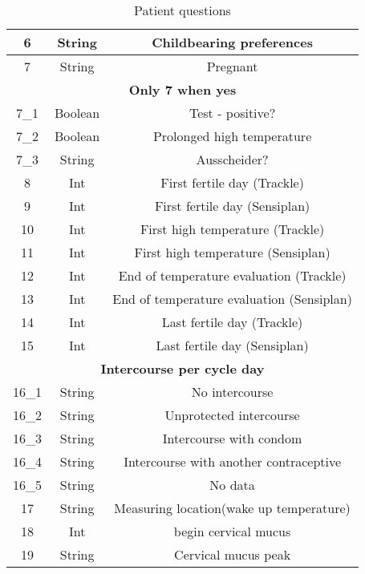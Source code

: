 \documentclass[
a4paper,
11pt
]{article}
\begin{document}
\begin{itemize}
\begin{center}
\begin{table}[h]
\begin{tabular}{|c|c|c|}
				\hline
				6 & String & Childbearing preferences \\
				\hline
				7 & String & Pregnant \\
				\hline
				\multicolumn{3}{c}{\textbf{Only 7 when yes}} \\
				\hline
				7\_1 & Boolean & Test - positive? \\
				\hline
				7\_2 & Boolean & Prolonged high temperature \\
				\hline
				7\_3 & String & Ausscheider? \\
				\hline
				8 & Int & First fertile day (Trackle) \\
				\hline
				9 & Int & First fertile day (Sensiplan\textsuperscript{\textcopyright}) \\
				\hline
				10 & Int & First high temperature (Trackle) \\
				\hline
				11 & Int & First high temperature (Sensiplan\textsuperscript{\textcopyright}) \\
				\hline
				12 & Int & End of temperature evaluation (Trackle) \\
				\hline
				13 & Int & End of temperature evaluation (Sensiplan\textsuperscript{\textcopyright}) \\
				\hline
				14 & Int & Last fertile day (Trackle) \\
				\hline
				15 & Int & Last fertile day (Sensiplan\textsuperscript{\textcopyright}) \\
				\hline
				\multicolumn{3}{c}{\textbf{Intercourse per cycle day}} \\
				\hline
				16\_1 & String &  No intercourse \\
				\hline
				16\_2 & String &  Unprotected intercourse \\
				\hline
				16\_3 & String &  Intercourse with condom \\
				\hline
				16\_4 & String &  Intercourse with another contraceptive \\
				\hline
				16\_5 & String &  No data \\
				\hline
				17 & String &  Measuring location(wake up temperature) \\
				\hline
				18 & Int &  begin cervical mucus \\
				\hline
				19 & String &  Cervical mucus peak \\
				\hline
			\end{tabular}
		\caption{Patient questions}
		\end{table}
		\end{center}

\end{itemize}
\end{document}

